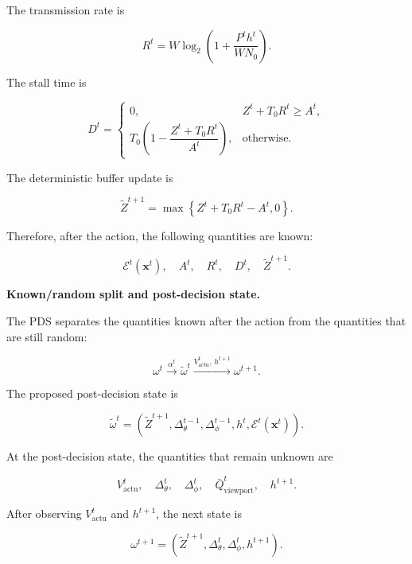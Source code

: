 \documentclass[10pt,conference,a4paper]{IEEEtran}
\newcommand{\head}[1]{%
    \vspace{2pt}
    \noindent
    \textbf{#1}
    \hspace{2pt}
}
\begin{document}
The transmission rate is

\begin{equation}
R^t
=
W\log_2
\left(
1+
\frac{P^th^t}{WN_0}
\right).
\end{equation}

The stall time is

\begin{equation}
D^t
=
\begin{cases}
0,
&
Z^t+T_0R^t\geq A^t,
\\[1pt]
T_0
\left(
1-
\dfrac{Z^t+T_0R^t}{A^t}
\right),
&
\text{otherwise}.
\end{cases}
\end{equation}

The deterministic buffer update is

\begin{equation}
\widetilde Z^{t+1}
=
\max
\left\{
Z^t+T_0R^t-A^t,
0
\right\}.
\end{equation}

Therefore, after the action, the following quantities are known:

\[
\mathcal{E}^t(\mathbf{x}^t),
\quad
A^t,
\quad
R^t,
\quad
D^t,
\quad
\widetilde Z^{t+1}.
\]


\head{Known/random split and post-decision state.}
The PDS separates the quantities known after the action from the
quantities that are still random:

\[
\omega^t
\xrightarrow{\alpha^t}
\widetilde\omega^t
\xrightarrow{
V_{\mathrm{actu}}^t,\,
h^{t+1}
}
\omega^{t+1}.
\]

The proposed post-decision state is

\begin{equation}
\widetilde\omega^t
=
\left(
\widetilde Z^{t+1},
\Delta_\theta^{t-1},
\Delta_\phi^{t-1},
h^t,
\mathcal{E}^t(\mathbf{x}^t)
\right).
\end{equation}

At the post-decision state, the quantities that remain unknown are

\[
V_{\mathrm{actu}}^t,
\quad
\Delta_\theta^t,
\quad
\Delta_\phi^t,
\quad
\bar Q_{\mathrm{viewport}}^t,
\quad
h^{t+1}.
\]

After observing $V_{\mathrm{actu}}^t$ and $h^{t+1}$, the next
state is

\begin{equation}
\omega^{t+1}
=
\left(
\widetilde Z^{t+1},
\Delta_\theta^t,
\Delta_\phi^t,
h^{t+1}
\right).
\end{equation}
\end{document}
